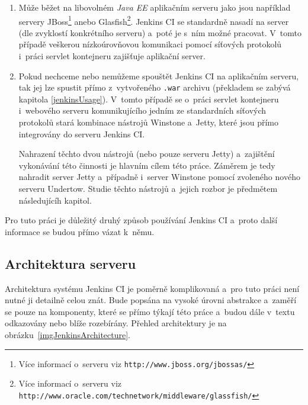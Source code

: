             \begin{enumerate}
                \item{Může běžet na libovolném \emph{Java EE} aplikačním serveru \cite{jenkinsServers} jako jsou například servery 
                JBoss\footnote{Více informací o~serveru viz \texttt{http://www.jboss.org/jbossas/}} 
                anebo Glasfish\footnote{Více informací o~serveru viz \texttt{http://www.oracle.com/technetwork/middleware/glassfish/}}}.
                Jenkins CI se standardně nasadí na server (dle zvyklostí konkrétního serveru)
                a~poté je s~ním možné pracovat. V~tomto případě veškerou nízkoúrovňovou komunikaci pomocí síťových protokolů 
                i~práci servlet kontejneru zajišťuje aplikační server.
                
                \item{Pokud nechceme nebo nemůžeme spouštět Jenkins CI na aplikačním serveru, tak jej lze spustit přímo
                    z~vytvořeného \texttt{.war} archivu (překladem se zabývá kapitola \ref{jenkinsUsage}). V~tomto případě
                    se o~práci servlet kontejneru i~webového serveru komunikujícího jedním ze standardních síťových protokolů stará 
                    kombinace nástrojů Winstone a~Jetty, které jsou přímo integrovány do serveru Jenkins CI. 
                    
                    Nahrazení těchto dvou nástrojů (nebo pouze serveru Jetty) a~zajištění vykonávání této činnosti je hlavním cílem této práce.
                    Záměrem je tedy nahradit server Jetty a~případně i~server Winstone pomocí zvoleného nového serveru Undertow.
                    Studie těchto nástrojů a~jejich rozbor je předmětem následujícíh kapitol.}
            \end{enumerate}

            Pro tuto práci je důležitý druhý způsob používání Jenkins CI a~proto další informace se budou přímo vázat k~němu.

         \subsection{Architektura serveru}   \label{secJenkinsArchitektura}
            Architektura systému Jenkins CI je poměrně komplikovaná a~pro tuto práci není nutné ji detailně celou znát.
            Bude popsána na vysoké úrovni abstrakce a~zaměří se pouze na komponenty, které se přímo týkají této práce
            a~budou dále v~textu odkazovány nebo blíže rozebírány. Přehled architektury je na obrázku~\ref{imgJenkinsArchitecture}.
       

